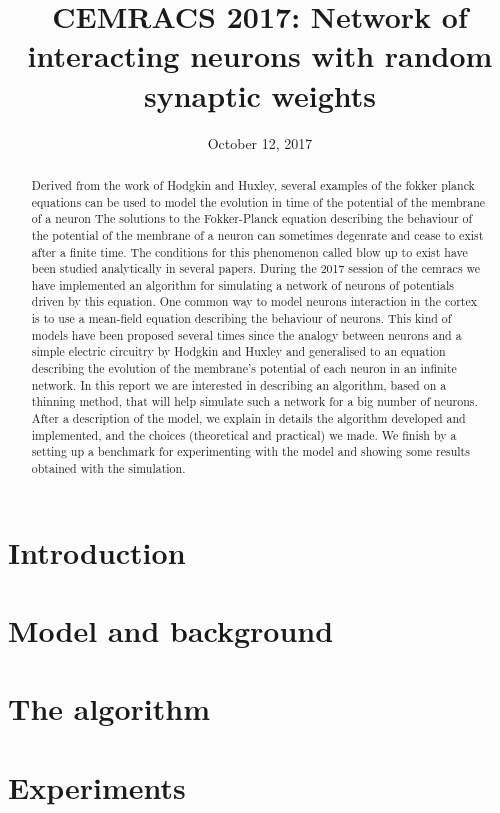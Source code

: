 \documentclass{report}
\title{CEMRACS 2017: Network of interacting neurons with random synaptic weights}
\date{October 12, 2017}
\author{}
\begin{document}
\maketitle

\begin{abstract}
	Derived from the work of Hodgkin and Huxley, several examples of the fokker planck equations can be used to model the evolution in time of the potential of the membrane of a neuron
	The solutions to the Fokker-Planck equation describing the behaviour of the potential of the membrane of a neuron can sometimes degenrate and cease to exist after a finite time. The conditions for this phenomenon called blow up to exist have been studied analytically in several papers. During the 2017 session of the cemracs we have implemented an algorithm for simulating a network of neurons of potentials driven by this equation. 
	One common way to model neurons interaction in the cortex is to use a mean-field equation describing the behaviour of neurons. This kind of models have been proposed several times since the analogy between neurons and a simple electric circuitry by Hodgkin and Huxley and generalised to an equation describing the evolution of the membrane's potential of each neuron in an infinite network. In this report we are interested in describing an algorithm, based on a thinning method, that will help simulate such a network for a big number of neurons. After a description of the model, we explain in details the algorithm developed and implemented, and the choices (theoretical and practical) we made. We finish by a setting up a benchmark for experimenting with the model and showing some results obtained with the simulation.
\end{abstract}

\tableofcontents

\section{Introduction}
	
\section{Model and background}
	
\section{The algorithm}
	
\section{Experiments}


\nocite{*}

\end{document}
